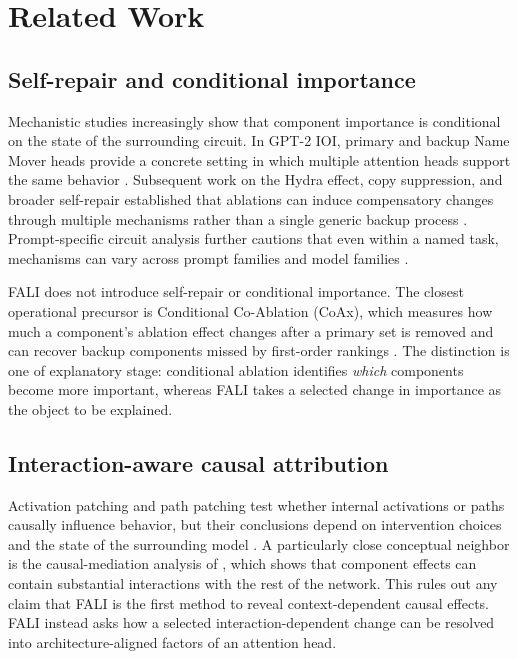 \section{Related Work}\label{sec:related}

\subsection{Self-repair and conditional importance}\label{sec:rw-conditional}

Mechanistic studies increasingly show that component importance is conditional on the state of the surrounding circuit. In GPT-2 IOI, primary and backup Name Mover heads provide a concrete setting in which multiple attention heads support the same behavior \citep{wang2023ioi}. Subsequent work on the Hydra effect, copy suppression, and broader self-repair established that ablations can induce compensatory changes through multiple mechanisms rather than a single generic backup process \citep{mcgrath2023hydra,mcdougall2023copysuppression,rushing2024selfrepair}. Prompt-specific circuit analysis further cautions that even within a named task, mechanisms can vary across prompt families and model families \citep{franco2026promptspecific}.

FALI does not introduce self-repair or conditional importance. The closest operational precursor is Conditional Co-Ablation (CoAx), which measures how much a component's ablation effect changes after a primary set is removed and can recover backup components missed by first-order rankings \citep{gong2026coax}. The distinction is one of explanatory stage: conditional ablation identifies \emph{which} components become more important, whereas FALI takes a selected change in importance as the object to be explained.

\subsection{Interaction-aware causal attribution}\label{sec:rw-interaction}

Activation patching and path patching test whether internal activations or paths causally influence behavior, but their conclusions depend on intervention choices and the state of the surrounding model \citep{goldowskydill2023pathpatching,zhang2024activationpatching,heimersheim2024activationpatching}. A particularly close conceptual neighbor is the causal-mediation analysis of \citet{vaidyanathan2026curse}, which shows that component effects can contain substantial interactions with the rest of the network. This rules out any claim that FALI is the first method to reveal context-dependent causal effects. FALI instead asks how a selected interaction-dependent change can be resolved into architecture-aligned factors of an attention head.

